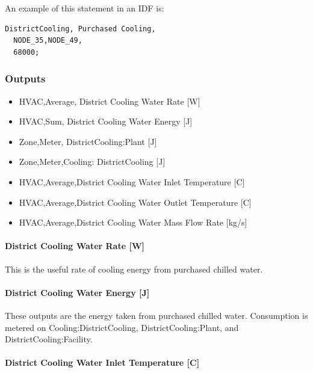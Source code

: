 An example of this statement in an IDF is:

\begin{lstlisting}
DistrictCooling, Purchased Cooling,
  NODE_35,NODE_49,
  68000;
\end{lstlisting}

\subsubsection{Outputs}\label{outputs-14-003}

\begin{itemize}
    \item
    HVAC,Average, District Cooling Water Rate {[}W{]}
    \item
    HVAC,Sum, District Cooling Water Energy {[}J{]}
    \item
    Zone,Meter, DistrictCooling:Plant {[}J{]}
    \item
    Zone,Meter,Cooling: DistrictCooling {[}J{]}
    \item
    HVAC,Average,District Cooling Water Inlet Temperature {[}C{]}
    \item
    HVAC,Average,District Cooling Water Outlet Temperature {[}C{]}
    \item
    HVAC,Average,District Cooling Water Mass Flow Rate {[}kg/s{]}
\end{itemize}

\paragraph{District Cooling Water Rate {[}W{]}}\label{district-cooling-chilled-water-rate-w}

This is the useful rate of cooling energy from purchased chilled water.

\paragraph{District Cooling Water Energy {[}J{]}}\label{district-cooling-chilled-water-energy-j}

These outputs are the energy taken from purchased chilled water. Consumption is metered on Cooling:DistrictCooling, DistrictCooling:Plant, and DistrictCooling:Facility.

\paragraph{District Cooling Water Inlet Temperature {[}C{]}}\label{district-cooling-inlet-temperature-c}

